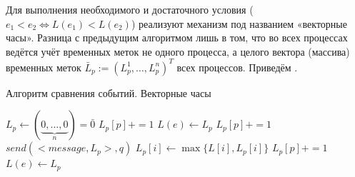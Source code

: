 Для выполнения необходимого и достаточного условия ($e_1 < e_2 \Leftrightarrow L(e_1) < L(e_2)$) реализуют механизм под названием «векторные часы». Разница с предыдущим алгоритмом лишь в том, что во всех процессах ведётся учёт временных меток не одного процесса, а целого вектора (массива) временных меток $\bar{L}_p := (L_p^1, \ldots, L_p^n)^T$ всех процессов.
Приведём .
\begin{algorithm}
\caption{Алгоритм сравнения событий. Векторные часы}
\label{algComparisonVecClock}
\begin{algorithmic}
\State $L_p \gets (\underbrace{0,\ldots,0}_{n}) = \bar{0}$
 
    \State $L_p[p] += 1$
    \State $L(e) \gets L_p$ 
\EndIf
{}
    \State $L_p[p] += 1$
    \State $send(<message, L_p>, q)$ 
\EndIf
{}
        \State $L_p[i] \gets \max\{L[i],L_p[i]\}$
    \EndFor
    \State $L_p[p] += 1$
    \State $L(e) \gets L_p$
\EndIf
\EndFunction
\end{algorithmic}
\end{algorithm}
